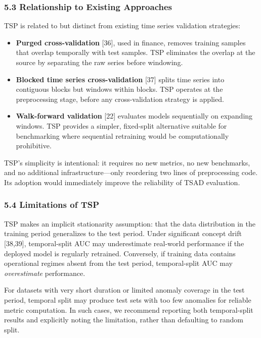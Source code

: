 \documentclass[
]{article}
\providecommand{\tightlist}{%
  \setlength{\itemsep}{0pt}\setlength{\parskip}{0pt}}
\begin{document}
\subsubsection{5.3 Relationship to Existing
Approaches}\label{relationship-to-existing-approaches}

TSP is related to but distinct from existing time series validation
strategies:

\begin{itemize}
\tightlist
\item
  \textbf{Purged cross-validation} {[}36{]}, used in finance, removes
  training samples that overlap temporally with test samples. TSP
  eliminates the overlap at the source by separating the raw series
  before windowing.
\item
  \textbf{Blocked time series cross-validation} {[}37{]} splits time
  series into contiguous blocks but windows within blocks. TSP operates
  at the preprocessing stage, before any cross-validation strategy is
  applied.
\item
  \textbf{Walk-forward validation} {[}22{]} evaluates models
  sequentially on expanding windows. TSP provides a simpler, fixed-split
  alternative suitable for benchmarking where sequential retraining
  would be computationally prohibitive.
\end{itemize}

TSP's simplicity is intentional: it requires no new metrics, no new
benchmarks, and no additional infrastructure---only reordering two lines
of preprocessing code. Its adoption would immediately improve the
reliability of TSAD evaluation.

\subsubsection{5.4 Limitations of TSP}\label{limitations-of-tsp}

TSP makes an implicit stationarity assumption: that the data
distribution in the training period generalizes to the test period.
Under significant concept drift {[}38,39{]}, temporal-split AUC may
underestimate real-world performance if the deployed model is regularly
retrained. Conversely, if training data contains operational regimes
absent from the test period, temporal-split AUC may \emph{overestimate}
performance.

For datasets with very short duration or limited anomaly coverage in the
test period, temporal split may produce test sets with too few anomalies
for reliable metric computation. In such cases, we recommend reporting
both temporal-split results and explicitly noting the limitation, rather
than defaulting to random split.
\end{document}
